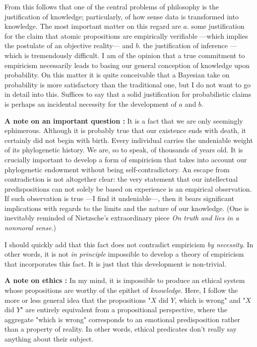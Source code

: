 \documentclass[a4paper]{article}
\begin{document}
From this follows that one of the central problems of philosophy is the
justification of knowledge; particularly, of how sense data is transformed into
knowledge. The most important matter on this regard are $a.$ some justification
for the claim that atomic propositions are empirically verifiable ---which
implies the postulate of an objective reality--- and $b.$ the justification of
inference ---which is tremendously difficult. I am of the opinion that a true
commitment to empiricism necessarily leads to basing our general conception of
knowledge upon probability. On this matter it is quite conceivable that a
Bayesian take on probability is more satisfactory than the traditional one, but
I do not want to go in detail into this. Suffices to say that a solid
justification for probabilistic claims is perhaps an incidental necessity
for the development of $a$ and $b$.

\textbf{A note on an important question : } It is a fact that we are only
seemingly ephimerous. Although it is probably true that our existence ends with
death, it certainly did not begin with birth. Every individual carries the
undeniable weight of its phylogenetic history. We are, so to speak, of thousands
of years old. It is crucially important to develop a form of empiricism that
takes into account our phylogenetic endowment without being self-contradictory.
An escape from contradiction is not altogether clear: the very statement that
our intellectual predispositions can not solely be based on experience is an
empirical observation. If such observation is true ---I find it undeniable---,
then it bears significant implications with regards to the limits and the nature
of our knowledge. (One is inevitably reminded of Nietzsche's extraordinary piece
\textit{On truth and lies in a nonmoral sense}.) 

I should quickly add that this fact does not contradict empiricism \textit{by
necessity}. In other words, it is not \textit{in principle} impossible to
develop a theory of empiricism that incorporates this fact. It is just that this
development is non-trivial.

\textbf{A note on ethics : } In my mind, it is impossible to produce an ethical
system whose propositions are worthy of the epithet of \textit{knowledge}. Here,
I follow the more or less general idea that the propositions "$X$ did $Y$, which
is wrong" and "$X$ did $Y$" are entirely equivalent from a propositional
perspective, where the aggregate "which is wrong" corresponds to an emotional
predisposition rather than a property of reality. In other words, ethical
predicates don't really say anything about their subject.
\end{document}
